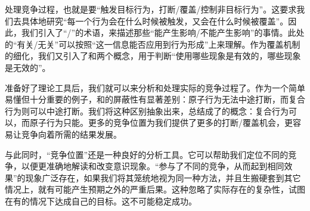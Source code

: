 处理竞争过程，也就是要“触发目标行为，打断/覆盖/控制非目标行为”。这要求我们去具体地研究“每一个行为会在什么时候被触发，又会在什么时候被覆盖”。因此，我们引入了“/”的术语，来描述那些“能产生影响/不能产生影响”的事情。此处的“有关/无关”可以按照“这一信息能否应用到行为形成”上来理解。作为覆盖机制的细化，我们又引入了和两个概念，用于判断“使用哪些现象是有效的，哪些现象是无效的”。

准备好了理论工具后，我们就可以来分析和处理实际的竞争过程了。作为一个简单易懂但十分重要的例子，和的屏蔽性有显著差别：原子行为无法中途打断，而复合行为则可以中途打断。我们将这种区别抽象出来，总结成了的概念：复合行为可以，而原子行为只能。更多的竞争位置为我们提供了更多的打断/覆盖机会，更容易让竞争向着所需的结果发展。

与此同时，“竞争位置”还是一种良好的分析工具。它可以帮助我们定位不同的竞争，以便更准确地解读和改变意识现象。“参与了不同的竞争，从而起到相同效果”的现象广泛存在，如果我们将其笼统地视为同一种方法，并且生搬硬套到其它情况上，就有可能产生预期之外的严重后果。这种忽略了实际存在的复杂性，试图在有的情况下达成自己的目标。这不可能稳定成功。


